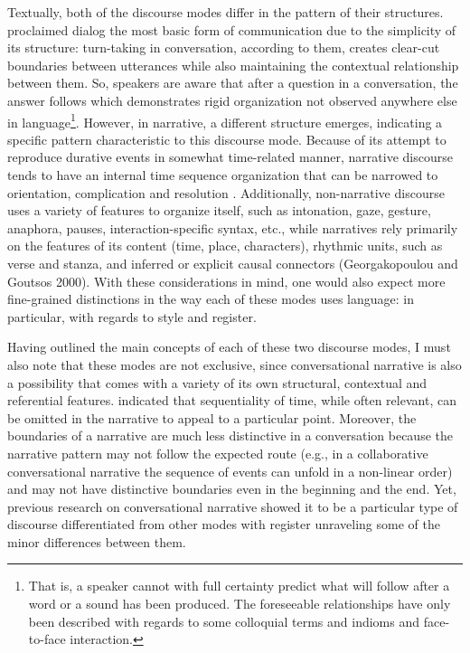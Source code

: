 \documentclass[12pt]{article}
\begin{document}
Textually, both of the discourse modes differ in the pattern of their structures. \textcite{bakhtin1986} proclaimed dialog the most basic form of communication due to the simplicity of its structure: turn-taking in conversation, according to them, creates clear-cut boundaries between utterances while also maintaining the contextual relationship between them. So, speakers are aware that after a question in a conversation, the answer follows which demonstrates rigid organization not observed anywhere else in language\footnote{That is, a speaker cannot with full certainty predict what will follow after a word or a sound has been produced. The foreseeable relationships have only been described with regards to some colloquial terms and indioms and face-to-face interaction.}. However, in  narrative, a different structure emerges, indicating a specific pattern characteristic to this discourse mode. Because of its attempt to reproduce durative events in somewhat time-related manner, narrative discourse tends to have an internal time sequence organization that can be narrowed to orientation, complication and resolution \parencite{labov1967}. Additionally, non-narrative discourse uses a variety of features to organize itself, such as intonation, gaze, gesture, anaphora, pauses, interaction-specific syntax, etc., while narratives rely primarily on the features of its content (time, place, characters), rhythmic units, such as verse and stanza, and inferred or explicit causal connectors (Georgakopoulou and Goutsos 2000). With these considerations in mind, one would also expect more fine-grained distinctions in the way each of these modes uses language: in particular, with regards to style and register. 

Having outlined the main concepts of each of these two discourse modes, I must also note that these modes are not exclusive, since conversational narrative is also a possibility that comes with a variety of its own structural, contextual and referential features. \textcite{norrick2000} indicated that sequentiality of time, while often relevant, can be omitted in the narrative to appeal to a particular point. Moreover, the boundaries of a narrative are much less distinctive in a conversation because the narrative pattern may not follow the expected route (e.g., in a collaborative conversational narrative the sequence of events can unfold in a non-linear order) and may not have distinctive boundaries even in the beginning and the end. Yet, previous research on conversational narrative showed it to be a particular type of discourse differentiated from other modes with register unraveling some of the minor differences between them.
\end{document}
